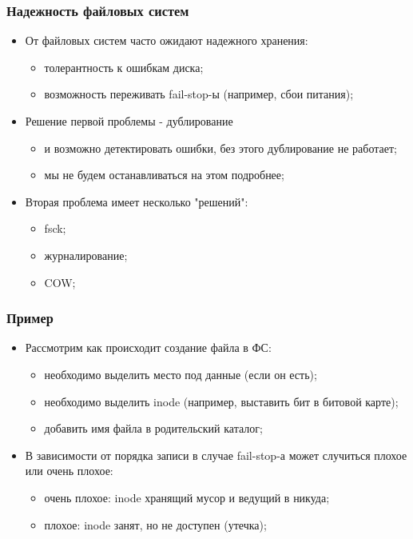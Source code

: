 \begin{frame}
\frametitle{Надежность файловых систем}
\begin{itemize}
  \item<1-> От файловых систем часто ожидают надежного хранения:
    \begin{itemize}
      \item толерантность к ошибкам диска;
      \item возможность переживать fail-stop-ы (например, сбои питания);
    \end{itemize}
  \item<2-> Решение первой проблемы - дублирование
    \begin{itemize}
      \item и возможно детектировать ошибки, без этого дублирование не работает;
      \item мы не будем останавливаться на этом подробнее;
    \end{itemize}
  \item<3-> Вторая проблема имеет несколько "решений":
    \begin{itemize}
      \item fsck;
      \item журналирование;
      \item COW;
    \end{itemize}
\end{itemize}
\end{frame}

\begin{frame}
\frametitle{Пример}
\begin{itemize}
  \item<1-> Рассмотрим как происходит создание файла в ФС:
    \begin{itemize}
      \item необходимо выделить место под данные (если он есть);
      \item необходимо выделить inode (например, выставить бит в битовой карте);
      \item добавить имя файла в родительский каталог;
    \end{itemize}
  \item<2-> В зависимости от порядка записи в случае fail-stop-а может случиться плохое или очень плохое:
    \begin{itemize}
      \item очень плохое: inode хранящий мусор и ведущий в никуда;
      \item плохое: inode занят, но не доступен (утечка);
    \end{itemize}
\end{itemize}
\end{frame}


